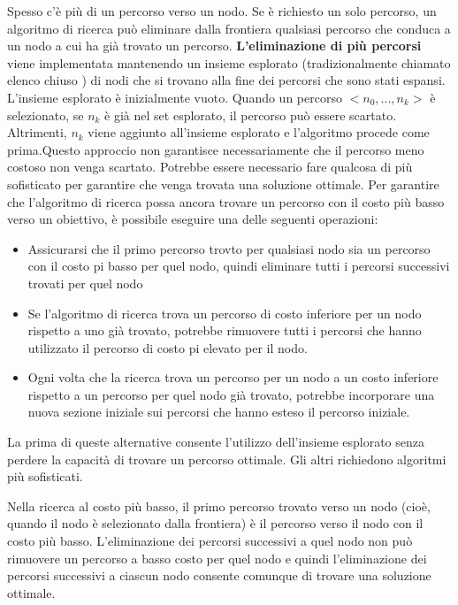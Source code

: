 \documentclass[a4paper]{extarticle}
\begin{document}
Spesso c'è più di un percorso verso un nodo. Se è richiesto un solo percorso, un algoritmo di ricerca può eliminare dalla frontiera qualsiasi percorso che conduca a un nodo a cui ha già trovato un percorso. \textbf{L'eliminazione di più percorsi} viene implementata mantenendo un insieme esplorato (tradizionalmente chiamato elenco chiuso ) di nodi che si trovano alla fine dei percorsi che sono stati espansi. L'insieme esplorato è inizialmente vuoto. Quando un percorso $<n_0,...,n_k>$ è selezionato, se $n_k$ è già nel set esplorato, il percorso può essere scartato. Altrimenti, $n_k$ viene aggiunto all'insieme esplorato e l'algoritmo procede come prima.Questo approccio non garantisce necessariamente che il percorso meno costoso non venga scartato. Potrebbe essere necessario fare qualcosa di più sofisticato per garantire che venga trovata una soluzione ottimale. Per garantire che l'algoritmo di ricerca possa ancora trovare un percorso con il costo più basso verso un obiettivo, è possibile eseguire una delle seguenti operazioni:
\begin{itemize}
\item Assicurarsi che il primo percorso trovto per qualsiasi nodo sia un percorso con il costo pi basso per quel nodo, quindi eliminare tutti i percorsi successivi trovati per quel nodo
\item Se l'algoritmo di ricerca trova un percorso di costo inferiore per un nodo rispetto a uno già trovato, potrebbe rimuovere tutti i percorsi che hanno utilizzato il percorso di costo pi elevato per il nodo.
\item Ogni volta che la ricerca trova un percorso per un nodo a un costo inferiore rispetto a un percorso per quel nodo già trovato, potrebbe incorporare una nuova sezione iniziale sui percorsi che hanno esteso il percorso iniziale.
\end{itemize}

La prima di queste alternative consente l'utilizzo dell'insieme esplorato senza perdere la capacità di trovare un percorso ottimale. Gli altri richiedono algoritmi più sofisticati.

Nella ricerca al costo più basso, il primo percorso trovato verso un nodo (cioè, quando il nodo è selezionato dalla frontiera) è il percorso verso il nodo con il costo più basso. L'eliminazione dei percorsi successivi a quel nodo non può rimuovere un percorso a basso costo per quel nodo e quindi l'eliminazione dei percorsi successivi a ciascun nodo consente comunque di trovare una soluzione ottimale.
\end{document}

